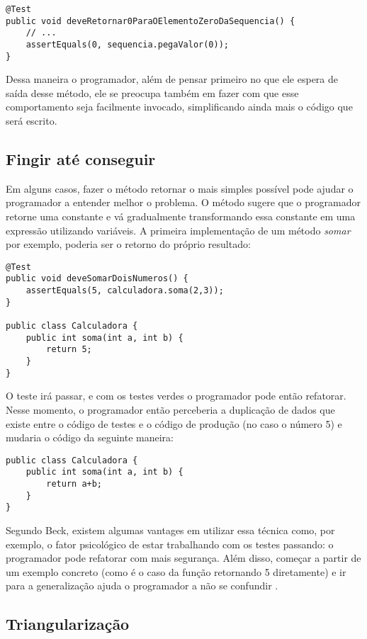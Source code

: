 \begin{lstlisting}[frame=trbl]
@Test
public void deveRetornar0ParaOElementoZeroDaSequencia() {
	// ...
	assertEquals(0, sequencia.pegaValor(0));
}
\end{lstlisting}

Dessa maneira o programador, além de pensar primeiro no que ele espera de saída desse método, ele se preocupa também 
em fazer com que esse comportamento seja facilmente invocado, simplificando ainda mais o código que será escrito. 

\subsection{Fingir até conseguir}
\label{sec:fake-it}

Em alguns casos, fazer o método retornar o mais simples possível pode ajudar o programador a entender melhor o problema.
O método sugere que o programador retorne uma constante e vá gradualmente transformando essa constante em uma expressão
utilizando variáveis. A primeira implementação de um método \textit{somar} por exemplo, poderia ser o retorno do 
próprio resultado:

\begin{lstlisting}[frame=trbl]
@Test
public void deveSomarDoisNumeros() {
	assertEquals(5, calculadora.soma(2,3));
}

public class Calculadora {
	public int soma(int a, int b) {
		return 5;
	}
}
\end{lstlisting}

O teste irá passar, e com os testes verdes o programador pode então refatorar. Nesse momento, o programador então
perceberia a duplicação de dados que existe entre o código de testes e o código de produção (no caso o número 5) e 
mudaria o código da seguinte maneira:

\begin{lstlisting}[frame=trbl]
public class Calculadora {
	public int soma(int a, int b) {
		return a+b;
	}
}
\end{lstlisting}

Segundo Beck, existem algumas vantages em utilizar essa técnica como, por exemplo, o fator psicológico de estar
trabalhando com os testes passando: o programador pode refatorar com mais segurança. Além disso, começar a partir
de um exemplo concreto (como é o caso da função retornando 5 diretamente) e ir para a generalização ajuda o programador
a não se confundir \cite{TDDByExample}.

\subsection{Triangularização}
\label{sec:triangularizacao}

